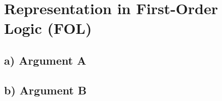 \section{Representation in First-Order Logic (FOL)}
\subsection{a) Argument A}
\begin{large}
    
\end{large}


\subsection{b) Argument B}
\begin{large}
    
\end{large}